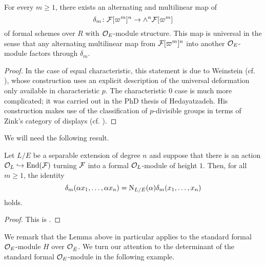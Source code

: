 \documentclass[../main.tex]{subfiles}
\begin{document}
\begin{thm}\label{thm:HedayatzadehsResult}
  For every $m \geq 1$, there exists an alternating and multilinear map of
  \begin{equation}\label{eq:determinantontorsionpoints}
    \delta_m \colon  \mathcal{F}[\varpi^m]^n \to \wedge^n \mathcal{F}[\varpi^m]
  \end{equation}
  of formal schemes over $R$ with $\mathcal{O}_E$-module structure. This map is universal
  in the sense that any alternating multilinear map from $\mathcal{F}[\varpi^m]^n$
  into another $\mathcal{O}_E$-module factors through $\delta_m$. 
\begin{proof}
  In the case of equal characteristic, this statement is due to Weinstein 
  (cf. \cite{weinstein2010goodreduc}), whose construction uses an explicit description
  of the universal deformation only available in characteristic $p$. The 
  characteristic $0$ case is much more complicated; it was carried out in the 
  PhD thesis of Hedayatzadeh. His construction makes use of the classification of 
  $p$-divisible groups in terms of Zink's category of displays (cf.
  \cite[Theorem 4.34]{hedayatzadeh2015det}).
\end{proof}
\end{thm}

We will need the following result.

\begin{lem}\label{lem:WeinsteinDeterminantAndNorm}
  Let $L/E$ be a separable extension of degree $n$ and suppose that there 
  is an action $\mathcal{O}_L \hookrightarrow \operatorname{End}(\mathcal{F})$ turning $\mathcal{F}$ into a formal
  $\mathcal{O}_L$-module of height $1$. Then, for all $m \geq 1$, the identity
  \begin{equation*}
    \delta_m(\alpha x_1, \dots, \alpha x_n) = \operatorname{N}_{L/E}(\alpha) \delta_m
    (x_1, \dots, x_n)
  \end{equation*}
  holds. 
  \begin{proof}
    This is \cite[Lemma 2.12]{weinstein2016semistable}.
  \end{proof}
\end{lem}

We remark that the Lemma above in particular applies to the standard formal 
$\mathcal{O}_E$-module $H$ over $\mathcal{O}_{\breve {E}}$. We turn our attention to the determinant of the standard
formal $\mathcal{O}_E$-module in the following example.
\end{document}
